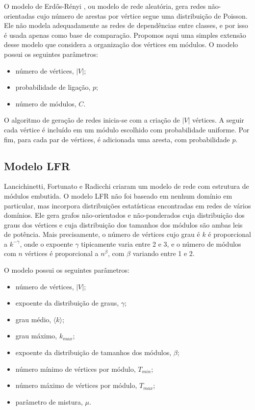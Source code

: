 \documentclass{acm_proc_article-sp}
\begin{document}
O modelo de Erdős-Rényi \cite{Erdos1959}, ou modelo de rede aleatória, gera redes não-orientadas cujo número de arestas por vértice segue uma distribuição de Poisson. Ele não modela adequadamente as redes de dependências entre classes, e por isso é usada apenas como base de comparação. Propomos aqui uma simples extensão desse modelo que considera a organização dos vértices em módulos. O modelo possui os seguintes parâmetros:

\begin{itemize}
  \item número de vértices, $|V|$;
  \item probabilidade de ligação, $p$;
  \item número de módulos, $C$.
\end{itemize} 

O algoritmo de geração de redes inicia-se com a criação de $|V|$ vértices. A seguir cada vértice é incluído em um módulo escolhido com probabilidade uniforme. Por fim, para cada par de vértices, é adicionada uma aresta, com probabilidade $p$.

\subsection{Modelo LFR}

Lancichinetti, Fortunato e Radicchi \cite{Lancichinetti2008} criaram um modelo de rede com estrutura de módulos embutida. O modelo LFR não foi baseado em nenhum domínio em particular, mas incorpora distribuições estatísticas encontradas em redes de vários domínios. Ele gera grafos não-orientados e não-ponderados cuja distribuição dos graus dos vértices e cuja distribuição dos tamanhos dos módulos são ambas leis de potência. Mais precisamente, o número de vértices cujo grau é $k$ é proporcional a $k^{-\gamma}$, onde o expoente $\gamma$ tipicamente varia entre 2 e 3, e o número de módulos com $n$ vértices é proporcional a $n^{\beta}$, com $\beta$ variando entre 1 e 2.

O modelo possui os seguintes parâmetros:
\begin{itemize}
  \item número de vértices, $|V|$;
  \item expoente da distribuição de graus, $\gamma$;
  \item grau médio, $\langle k \rangle$;
  \item grau máximo, $k_{max}$;
  \item expoente da distribuição de tamanhos dos módulos, $\beta$;
  \item número mínimo de vértices por módulo, $T_{min}$;
  \item número máximo de vértices por módulo, $T_{max}$;
  \item parâmetro de mistura, $\mu$.
\end{itemize}
\end{document}
